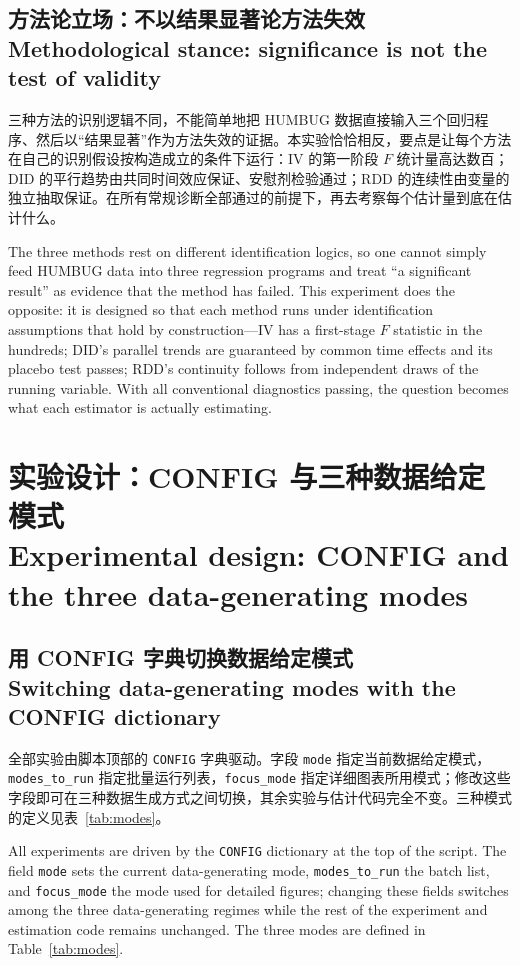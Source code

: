 \documentclass[12pt,a4paper]{ctexart}
\begin{document}
\subsection[方法论立场]{方法论立场：不以结果显著论方法失效\\[1pt]\normalsize Methodological stance: significance is not the test of validity}

三种方法的识别逻辑不同，不能简单地把 HUMBUG 数据直接输入三个回归程序、然后以“结果显著”作为方法失效的证据。本实验恰恰相反，要点是让每个方法在自己的识别假设按构造成立的条件下运行：IV 的第一阶段 $F$ 统计量高达数百；DID 的平行趋势由共同时间效应保证、安慰剂检验通过；RDD 的连续性由变量的独立抽取保证。在所有常规诊断全部通过的前提下，再去考察每个估计量到底在估计什么。

The three methods rest on different identification logics, so one cannot simply feed HUMBUG data into three regression programs and treat “a significant result” as evidence that the method has failed. This experiment does the opposite: it is designed so that each method runs under identification assumptions that hold by construction—IV has a first-stage $F$ statistic in the hundreds; DID's parallel trends are guaranteed by common time effects and its placebo test passes; RDD's continuity follows from independent draws of the running variable. With all conventional diagnostics passing, the question becomes what each estimator is actually estimating.

\section[实验设计：CONFIG 与三种数据给定模式]{实验设计：CONFIG 与三种数据给定模式\\[2pt]\normalsize Experimental design: CONFIG and the three data-generating modes}

\subsection[用 CONFIG 切换模式]{用 CONFIG 字典切换数据给定模式\\[1pt]\normalsize Switching data-generating modes with the CONFIG dictionary}

全部实验由脚本顶部的 \texttt{CONFIG} 字典驱动。字段 \texttt{mode} 指定当前数据给定模式，\texttt{modes\_to\_run} 指定批量运行列表，\texttt{focus\_mode} 指定详细图表所用模式；修改这些字段即可在三种数据生成方式之间切换，其余实验与估计代码完全不变。三种模式的定义见表~\ref{tab:modes}。

All experiments are driven by the \texttt{CONFIG} dictionary at the top of the script. The field \texttt{mode} sets the current data-generating mode, \texttt{modes\_to\_run} the batch list, and \texttt{focus\_mode} the mode used for detailed figures; changing these fields switches among the three data-generating regimes while the rest of the experiment and estimation code remains unchanged. The three modes are defined in Table~\ref{tab:modes}.
\end{document}
